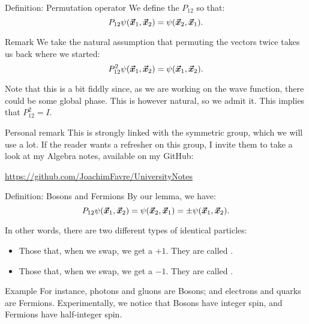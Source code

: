 \documentclass[a4paper]{article}
\begin{document}
\begin{parag}{Definition: Permutation operator}
    We define the  $P_{12}$ so that: 
    \[P_{12} \psi\left(\bvec{x}_1, \bvec{x}_2\right) = \psi\left(\bvec{x}_2, \bvec{x}_1\right).\]
    
    \begin{subparag}{Remark}
        We take the natural assumption that permuting the vectors twice takes us back where we started: 
        \[P_{12}^2 \psi\left(\bvec{x}_1, \bvec{x}_2\right) = \psi\left(\bvec{x}_1, \bvec{x}_2\right).\]

        Note that this is a bit fiddly since, as we are working on the wave function, there could be some global phase. This is however natural, so we admit it. This implies that $P_{12}^2 = I$. 
    \end{subparag}

    \begin{subparag}{Personal remark}
        This is strongly linked with the symmetric group, which we will use a lot. If the reader wants a refresher on this group, I invite them to take a look at my Algebra notes, available on my GitHub:
        \begin{center}
            \url{https://github.com/JoachimFavre/UniversityNotes}
        \end{center}
    \end{subparag}
\end{parag}

\begin{parag}{Definition: Bosons and Fermions}
    By our lemma, we have:
    \[P_{12} \psi\left(\bvec{x}_1, \bvec{x}_2\right) = \psi\left(\bvec{x}_2, \bvec{x}_1\right) = \pm \psi\left(\bvec{x}_1, \bvec{x}_2\right).\]

    In other words, there are two different types of identical particles:
    \begin{itemize}
        \item Those that, when we swap, we get a $+1$. They are called .
        \item Those that, when we swap, we get a $-1$. They are called .
    \end{itemize}
   
    \begin{subparag}{Example}
        For instance, photons and gluons are Bosons; and electrons and quarks are Fermions. Experimentally, we notice that Bosons have integer spin, and Fermions have half-integer spin.
    \end{subparag}
\end{parag}
\end{document}
